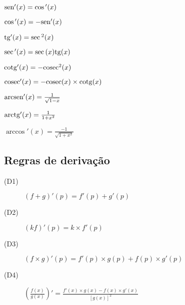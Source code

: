 \documentclass[11pt]{article}
\newcommand{\sen}{{\rm sen}}
\newcommand{\arcsen}{{\rm arcsen}}
\newcommand{\tg}{{\rm tg}}
\newcommand{\arctg}{{\rm arctg}}
\newcommand{\cosec}{{\rm cosec}}
\newcommand{\cotg}{{\rm cotg}}
\newcommand{\limit}[3]{{
  \underset{#1 \rightarrow #2}{\lim} #3
}}
\begin{document}
\begin{itemize}
  \begin{multicols}{2}
    \item $ \sen{'(x)} = \cos{'(x)} $
    \item $ \cos{'(x)} = -\sen{'(x)} $
    \item $ \tg{'(x)} = \sec{^2(x)} $
    \item $ \sec{'(x)} = \sec{(x)}\tg{(x)}$
    \item $ \cotg{'(x)} = -\cosec{^2(x)}$
    \item $ \cosec{'(x)} = -\cosec{(x)}\times \cotg{(x)}$
    \item $ \arcsen{'(x)} = \frac{1}{\sqrt{1-x}}$
    \item $ \arctg{'(x)} = \frac{1}{1+x^2 }$
    \item $ \arccos{'(x)} = \frac{-1}{\sqrt{1+x^2 }}$
  \end{multicols}
\end{itemize}

\subsection{Regras de derivação}

\begin{description}
  \item[(D1)] $(f+g)'(p) = f'(p) + g'(p)$
  \item[(D2)] $(kf)'(p) = k\times f'(p)$
  \item[(D3)] $(f\times g)'(p) = f'(p)\times g(p) + f(p)\times g'(p)$
  \item[(D4)] $( \frac{f(x)}{g(x)} )' = \frac{f'(x)\times g(x) - f(x)\times
    g'(x)}{[g(x)]^2}$
\end{description}




\end{document}

